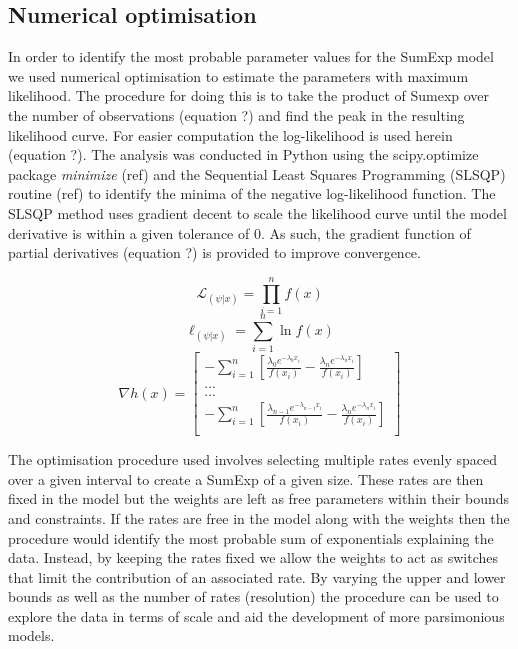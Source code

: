 \documentclass[11pt,usenames,dvipsnames]{article}
\newcommand{\Lagr}{\mathcal{L}}
\begin{document}
\subsection{Numerical optimisation}

\begin{linenumbers}
\hspace{\parindent}
In order to identify the most probable parameter values for the SumExp model we used numerical optimisation to estimate the parameters with maximum likelihood. The procedure for doing this is to take the product of Sumexp over the number of observations (equation ?) and find the peak in the resulting likelihood curve. For easier computation the log-likelihood is used herein (equation ?). The analysis was conducted in Python using the scipy.optimize package \textit{minimize} (ref) and the Sequential Least Squares Programming (SLSQP) routine (ref) to identify the minima of the negative log-likelihood function. The SLSQP method uses gradient decent to scale the likelihood curve until the model derivative is within a given tolerance of 0. As such, the gradient function of partial derivatives (equation ?) is provided to improve convergence.
\end{linenumbers}
\begin{equation}
\Lagr_{(\psi|x)} = \prod_{i=1}^{n} f(x)
\end{equation} 
\begin{equation}
\ell_{(\psi|x)} = \sum_{i=1}^{n} \ln f(x)
\end{equation} 
\begin{equation}
\nabla h(x) = \begin{bmatrix} -\sum_{i=1}^{n} [\frac{\lambda_0 e^{-\lambda_0 x_i}}{f(x_i)} - \frac{\lambda_n e^{-\lambda_n x_i}}{f(x_i)}] \\
... \\
... \\
-\sum_{i=1}^{n} [\frac{\lambda_{n-1} e^{-\lambda_{n-1} x_i}}{f(x_i)} - \frac{\lambda_n e^{-\lambda_n x_i}}{f(x_i)}] \\
\end{bmatrix}
\end{equation}

\begin{linenumbers}
The optimisation procedure used involves selecting multiple rates evenly spaced over a given interval to create a SumExp of a given size. These rates are then fixed in the model but the weights are left as free parameters within their bounds and constraints. If the rates are free in the model along with the weights then the procedure would identify the most probable sum of exponentials explaining the data. Instead, by keeping the rates fixed we allow the weights to act as switches that limit the contribution of an associated rate. By varying the upper and lower bounds as well as the number of rates (resolution) the procedure can be used to explore the data in terms of scale and aid the development of more parsimonious models. 
\end{linenumbers}
\end{document}
